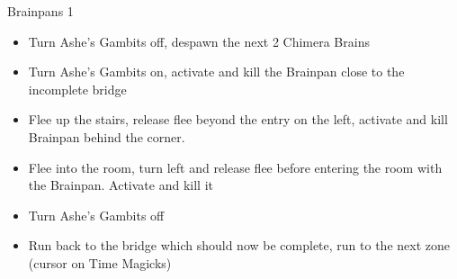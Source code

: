 \begin{battle}{Brainpans 1}
\begin{itemize}
		\item  Turn Ashe's Gambits off, despawn the next 2 Chimera Brains
		\item  Turn Ashe's Gambits on, activate and kill the Brainpan close to the incomplete bridge
		\item  Flee up the stairs, release flee beyond the entry on the left, activate and kill Brainpan behind the corner.
		\item  Flee into the room, turn left and release flee before entering the room with the Brainpan. Activate and kill it
		\item  Turn Ashe's Gambits off
		\item  Run back to the bridge which should now be complete, run to the next zone (cursor on Time Magicks)
	\end{itemize}
\end{battle}

